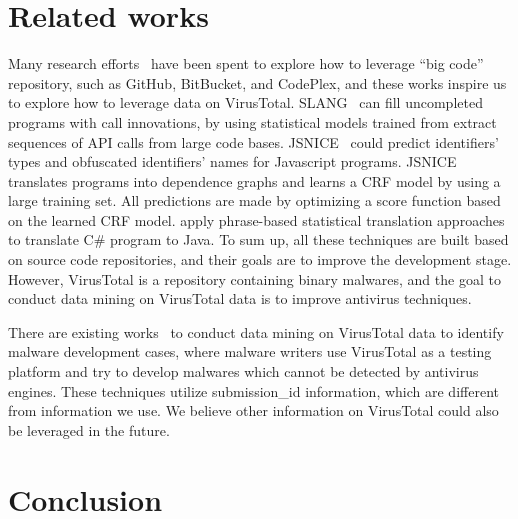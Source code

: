 \section{Related works}

Many research efforts~\cite{bigcode, big-lessons,big-translation,code-completion,big-predicting} 
have been spent to explore how to leverage ``big code'' repository, 
such as GitHub, BitBucket, and CodePlex, and these works inspire us to explore how to leverage data on VirusTotal. 
SLANG~\cite{code-completion} can fill uncompleted programs with call innovations, 
by using statistical models trained from extract sequences of API calls from large code bases.  
JSNICE~\cite{big-predicting} could predict identifiers' types and obfuscated identifiers' names for Javascript programs. 
JSNICE translates programs into dependence graphs and learns a CRF model by using a large training set. 
All predictions are made by optimizing a score function based on the learned CRF model. 
\citet{big-translation} apply phrase-based statistical translation approaches to translate C\# program to Java.
To sum up, all these techniques are built based on source code repositories, 
and their goals are to improve the development stage. 
However, VirusTotal is a repository containing binary malwares, 
and the goal to conduct data mining on VirusTotal data is to improve antivirus techniques. 

There are existing works~\cite{hacker-vt,neeles} to conduct data mining on VirusTotal data to identify malware development cases, 
where malware writers use VirusTotal as a testing platform and 
try to develop malwares which cannot be detected by antivirus engines. 
These techniques utilize submission\_id information, which are different from information we use. 
We believe other information on VirusTotal could also be leveraged in the future. 

\section{Conclusion}

